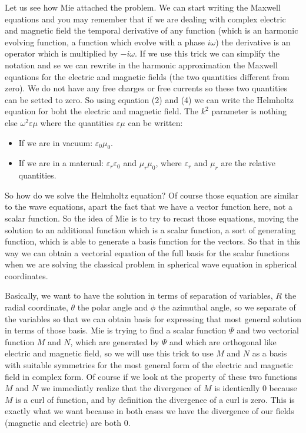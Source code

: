 \documentclass[../main/main.tex]{subfiles}
\begin{document}
Let us see how Mie attached the problem.
We can start writing the Maxwell equations and you may remember that if we are dealing with complex electric and magnetic field the temporal derivative of any function (which is an harmonic evolving function, a function which evolve with a phase \( i \omega  \)) the derivative is an operator which is multiplied by \( - i \omega  \). If we use this trick we can simplify the notation and se we can rewrite in the harmonic approximation the Maxwell equations for the electric and magnetic fields (the two quantities different from zero). We do not have any free charges or free currents so these two quantities can be setted to zero.
So using equation (2) and (4) we can write the Helmholtz equation for boht the electric and magnetic field. The \( k^2 \) parameter is nothing else \( \omega ^2 \varepsilon  \mu  \) where the quantities \( \varepsilon  \mu  \) can be written:
\begin{itemize}
\item If we are in vacuum: \( \varepsilon _0 \mu _0 \).
\item If we are in a materual: \( \varepsilon_r \varepsilon _0   \) and \( \mu _r \mu _0 \), where \( \varepsilon _r \) and \( \mu _r \) are the relative quantities.
\end{itemize}

So how do we solve the Helmholtz equation? Of course those equation are similar to the wave equations, apart the fact that we have a vector function here, not a scalar function.
So the idea of Mie is to try to recast those equations, moving the solution to an additional function which is a scalar function, a sort of generating function, which is able to generate a basis function for the vectors.
So that in this way we can obtain a vectorial equation of the full basis for the scalar functions when we are solving the classical problem in spherical wave equation in spherical coordinates.

Basically, we want to have the solution in terms of separation of variables, $R$ the radial coordinate, $\theta$  the polar angle and $\phi$ the azimuthal angle, so we separate of the variables so that we can obtain basis for expressing that most general solution in terms of those basis.
Mie is trying to find a scalar function $\Psi$ and two vectorial function $M$ and $N$, which are generated by \( \Psi  \) and which are orthogonal like electric and magnetic field, so we will use this trick to use $M$ and $N$ as a basis with suitable symmetries for the most general form of the electric and magnetic field in complex form.
Of course if we look at the property of these two functions \( M \) and \( N \) we immediatly realize that the divergence of \( M \) is identically 0 because \( M \) is a curl of function, and by definition the divergence of a curl is zero.
This is exactly what we want because in both cases we have the divergence of our fields (magnetic and electric) are both 0.
\end{document}
